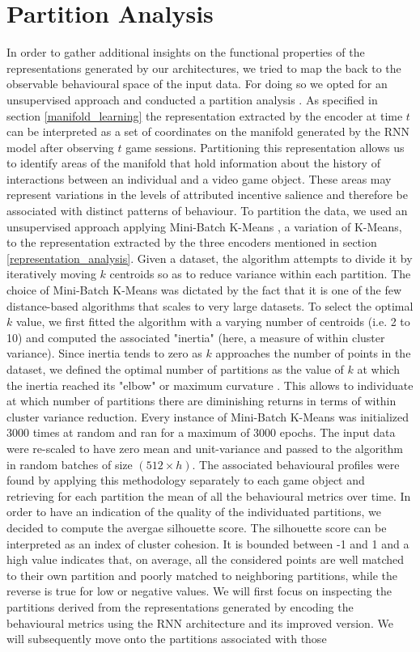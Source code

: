 \section{Partition Analysis}
\label{partition_analysese}
In order to gather additional insights on the functional properties of the representations generated by our architectures, we tried to map the back to the observable behavioural space of the input data.  For doing so we opted for an unsupervised approach and conducted a partition analysis . As specified in section \ref{manifold_learning} the representation extracted by the encoder at time $t$ can be interpreted as a set of coordinates on the manifold generated by the RNN model after observing $t$ game sessions. Partitioning this representation allows us to identify areas of the manifold that hold information about the history of interactions between an individual and a video game object. These areas may represent variations in the levels of attributed incentive salience and therefore be associated with distinct patterns of behaviour. To partition the data, we used an unsupervised approach applying Mini-Batch K-Means \cite{sculley2010web}, a variation of K-Means, to the representation extracted by the three encoders mentioned in section \ref{representation_analysis}. Given a dataset, the algorithm attempts to divide it by iteratively moving $k$ centroids so as to reduce variance within each partition. The choice of Mini-Batch K-Means was dictated by the fact that it is one of the few distance-based algorithms that scales to very large datasets. To select the optimal $k$ value, we first fitted the algorithm with a varying number of centroids (i.e. 2 to 10) and computed the associated "inertia" (here, a measure of within cluster variance). Since inertia tends to zero as $k$ approaches the number of points in the dataset, we defined the optimal number of partitions as the value of $k$ at which the inertia reached its "elbow" or maximum curvature \cite{satopaa2011finding}. This allows to individuate at which number of partitions there are diminishing returns in terms of within cluster variance reduction. Every instance of Mini-Batch K-Means was initialized 3000 times at random and ran for a maximum of 3000 epochs. The input data were re-scaled to have zero mean and unit-variance and passed to the algorithm in random batches of size $(512 \times h)$. The associated behavioural profiles were found by applying this methodology separately to each game object and retrieving for each partition the mean of all the behavioural metrics over time. In order to have an indication of the quality of the individuated partitions, we decided to compute the avergae silhouette score. The silhouette score can be interpreted as an index of cluster cohesion. It is bounded between -1 and 1 and a high value indicates that, on average, all the considered points are well matched to their own partition and poorly matched to neighboring partitions, while the reverse is true for low or negative values. We will first focus on inspecting the partitions derived from the representations generated by encoding the behavioural metrics using the RNN architecture and its improved version. We will subsequently move onto the partitions associated with those 